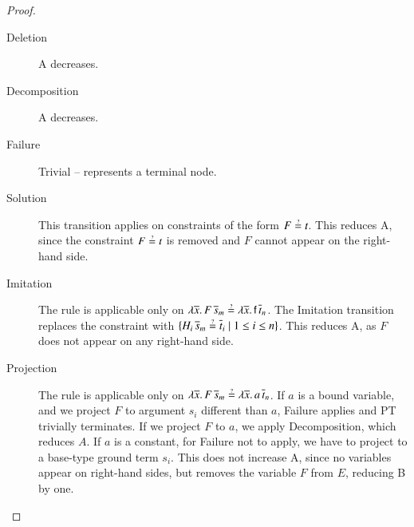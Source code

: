 \begin{proof}
    \begin{description}
      \item[Deletion] A decreases.
      \item[Decomposition] A decreases.
      \item[Failure] Trivial -- represents a terminal node.
      \item[Solution] This transition applies on 
        constraints of the form
        $F \unif t$. This reduces A, since the constraint $F \unif t$ is removed
        and $F$ cannot appear on the right-hand side.
      \item[Imitation] The rule is applicable only on 
        $\lambda \overline{x}.\, F \, \overline{s}_m  \unif \lambda
        \overline{x}.\, \cst{f} \, \overline{t}_n$. The \textsf{Imitation} transition
        replaces the constraint with $\{H_i \,
        \overline{s}_m  \unif \overline{t}_i \mid 1\le i\le n\}$. This reduces A, as $F$ does not appear on any right-hand side.
    \item[Projection] The rule is applicable only on 
        $\lambda \overline{x}.\, F \, \overline{s}_m  \unif \lambda
        \overline{x}.\, a \, \overline{t}_n$. If $a$ is a bound variable,
        and we project $F$ to argument $s_i$ different than $a$, \textsf{Failure} applies and
        PT trivially terminates. If we project $F$ to $a$, we apply \textsf{Decomposition},
        which reduces $A$. If $a$ is a constant, for \textsf{Failure} not to apply, we
        have to project to a base-type ground term $s_i$. This does not increase A,
        since no variables appear on right-hand sides, but removes the variable $F$
        from $E$, reducing B by one. \qedhere
    \end{description}
\end{proof}

